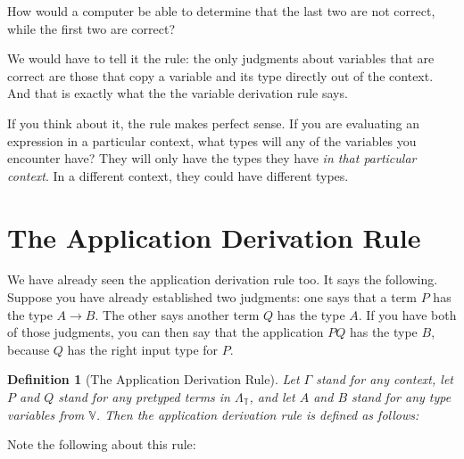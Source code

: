 \documentclass{book}
\numberwithin{equation}{chapter}
\newtheorem{definition}{Definition}
\begin{document}
How would a computer be able to determine that the last two are not correct, while the first two are correct? 

We would have to tell it the rule: the only judgments about variables that are correct are those that copy a variable and its type directly out of the context. And that is exactly what the the variable derivation rule says.

If you think about it, the rule makes perfect sense. If you are evaluating an expression in a particular context, what types will any of the variables you encounter have? They will only have the types they have \textit{in that particular context}. In a different context, they could have different types.


\section{The Application Derivation Rule}

We have already seen the application derivation rule too. It says the following. Suppose you have already established two judgments: one says that a term $P$ has the type $A \rightarrow B$. The other says another term $Q$ has the type $A$. If you have both of those judgments, you can then say that the application $PQ$ has the type $B$, because $Q$ has the right input type for $P$.

\begin{definition}[The Application Derivation Rule]
Let $\Gamma$ stand for any context, let $P$ and $Q$ stand for any pretyped terms in $\Lambda_{\mathbb{T}}$, and let $A$ and $B$ stand for any type variables from $\mathbb{V}$. Then the application derivation rule is defined as follows: 

\begin{prooftree}
\end{prooftree}

\end{definition}

\noindent
Note the following about this rule:
\end{document}
